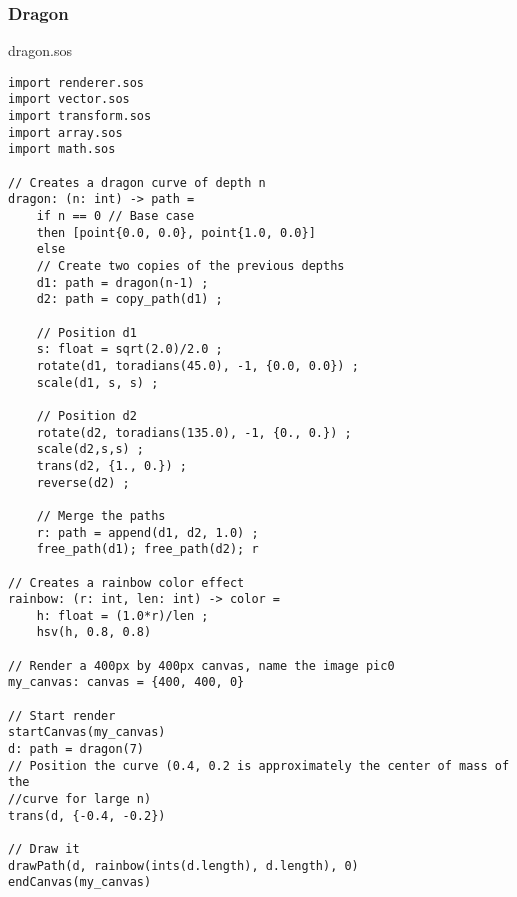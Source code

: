 \documentclass[main.tex]{subfiles}
\begin{document}
	\subsubsection{Dragon}
	\colorbox{blue!30}{dragon.sos}
	\begin{lstlisting}
import renderer.sos
import vector.sos
import transform.sos
import array.sos
import math.sos

// Creates a dragon curve of depth n
dragon: (n: int) -> path =
    if n == 0 // Base case
    then [point{0.0, 0.0}, point{1.0, 0.0}]
    else
    // Create two copies of the previous depths
    d1: path = dragon(n-1) ;
    d2: path = copy_path(d1) ;

    // Position d1
    s: float = sqrt(2.0)/2.0 ;
    rotate(d1, toradians(45.0), -1, {0.0, 0.0}) ;
    scale(d1, s, s) ;

    // Position d2
    rotate(d2, toradians(135.0), -1, {0., 0.}) ;
    scale(d2,s,s) ;
    trans(d2, {1., 0.}) ;
    reverse(d2) ;

    // Merge the paths
    r: path = append(d1, d2, 1.0) ;
    free_path(d1); free_path(d2); r

// Creates a rainbow color effect
rainbow: (r: int, len: int) -> color =
    h: float = (1.0*r)/len ;
    hsv(h, 0.8, 0.8)

// Render a 400px by 400px canvas, name the image pic0
my_canvas: canvas = {400, 400, 0}

// Start render
startCanvas(my_canvas)
d: path = dragon(7)
// Position the curve (0.4, 0.2 is approximately the center of mass of the 
//curve for large n)
trans(d, {-0.4, -0.2})

// Draw it
drawPath(d, rainbow(ints(d.length), d.length), 0)
endCanvas(my_canvas)
\end{lstlisting}
\end{document}
